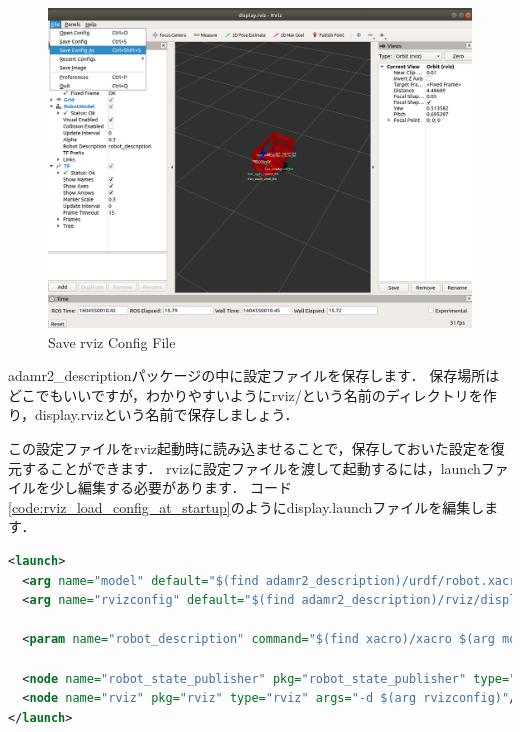 \documentclass[{../../master}]{subfiles}
\begin{document}
\begin{figure}[ht]
  \centering
  \includegraphics[height=40truemm]{images/rviz_save_config_as.png}
  \caption{Save \textsf{rviz} Config File}
  \label{fig:rviz_save_config_as}
\end{figure}

\noindent
\textsf{adamr2\_description}パッケージの中に設定ファイルを保存します．
保存場所はどこでもいいですが，わかりやすいように\textsf{rviz/}という名前のディレクトリを作り，\textsf{display.rviz}という名前で保存しましょう．

この設定ファイルを\textsf{rviz}起動時に読み込ませることで，保存しておいた設定を復元することができます．
\textsf{rviz}に設定ファイルを渡して起動するには，launchファイルを少し編集する必要があります．
コード\ref{code:rviz_load_config_at_startup}のように\textsf{display.launch}ファイルを編集します．

\begin{lstlisting}[language=XML, label=code:rviz_load_config_at_startup, caption=\textsf{rviz} Load Config File at Startup]
<launch>
  <arg name="model" default="$(find adamr2_description)/urdf/robot.xacro"/>
  <arg name="rvizconfig" default="$(find adamr2_description)/rviz/display.rviz"/>

  <param name="robot_description" command="$(find xacro)/xacro $(arg model)" />

  <node name="robot_state_publisher" pkg="robot_state_publisher" type="robot_state_publisher"/>
  <node name="rviz" pkg="rviz" type="rviz" args="-d $(arg rvizconfig)"/>
</launch>
\end{lstlisting}
\end{document}
